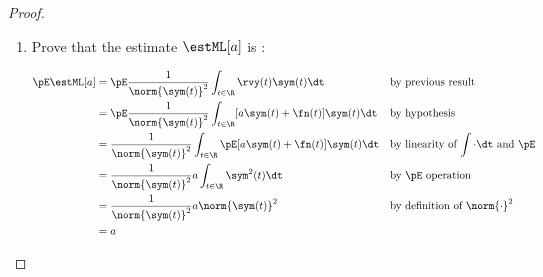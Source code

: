 \begin{proof}
\begin{enumerate}
\item Prove that the estimate $\estML[a]$ is :

\begin{align*}
   \pE\estML[a]
     &= \pE\frac{1}{\norm{\sym(t)}^2} \int_{t\in\R} \rvy(t)\sym(t) \dt
     && \text{by previous result}
   \\&= \pE\frac{1}{\norm{\sym(t)}^2} \int_{t\in\R} [ a \sym(t)+\fn(t)]\sym(t) \dt
     && \text{by hypothesis}
   \\&= \frac{1}{\norm{\sym(t)}^2} \int_{t\in\R} \pE[ a \sym(t)+\fn(t)]\sym(t) \dt
     && \text{by linearity of $\int\cdot\dt$ and $\pE$}
   \\&= \frac{1}{\norm{\sym(t)}^2}  a  \int_{t\in\R} \sym^2(t) \dt
     && \text{by $\pE$ operation}
   \\&= \frac{1}{\norm{\sym(t)}^2}  a  \norm{\sym(t)}^2
     && \text{by definition of $\norm{\cdot}^2$}
   \\&=   a
\end{align*}


\end{enumerate}
\end{proof}
